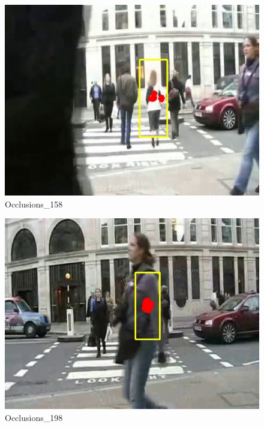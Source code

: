 \documentclass[10pt, conference, compsocconf]{IEEEtran}
\begin{document}
\begin{figure}[H]
	\centering
	\includegraphics[scale = 0.50]{image/p3/158.jpg}
	\caption{Occlusions\_158}
	\label{fig:p3_158}
\end{figure}

\begin{figure}[H]
	\centering
	\includegraphics[scale = 0.50]{image/p3/198.jpg}
	\caption{Occlusions\_198}
	\label{fig:p3_198}
\end{figure}
\end{document}
